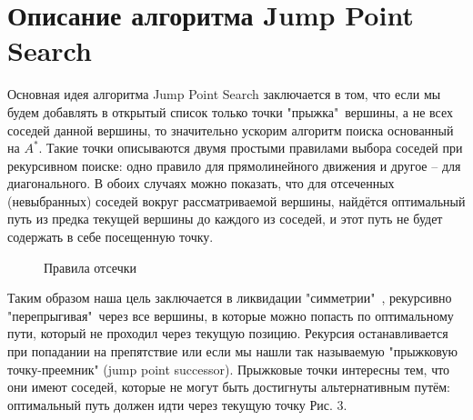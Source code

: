 \documentclass{physlab}
\begin{document}
\section{Описание алгоритма Jump Point Search}
Основная идея алгоритма Jump Point Search заключается в том, что если мы будем добавлять в открытый список только точки "прыжка"\ вершины, а не всех соседей данной вершины, то значительно ускорим алгоритм поиска основанный на $A^{*}$. Такие точки описываются двумя простыми правилами выбора соседей при рекурсивном поиске: одно правило для прямолинейного движения и другое – для диагонального. В обоих случаях можно показать, что для отсеченных (невыбранных) соседей вокруг рассматриваемой вершины, найдётся оптимальный путь из предка текущей вершины до каждого из соседей, и этот путь не будет содержать в себе посещенную точку. 
\begin{figure}[H]
\begin{minipage}[h]{0.55\linewidth}
\end{minipage}
\hfill
\begin{minipage}[h]{0.55\linewidth}
\end{minipage}
\caption{Правила отсечки}
\end{figure} 
Таким образом наша цель заключается в ликвидации "симметрии"\ , рекурсивно "перепрыгивая"\ через все вершины, в которые можно попасть по оптимальному пути, который не проходил через текущую позицию. Рекурсия останавливается при попадании на препятствие или если мы нашли так называемую "прыжковую точку-преемник" (jump point successor). Прыжковые точки интересны тем, что они имеют соседей, которые не могут быть достигнуты альтернативным путём: оптимальный путь должен идти через текущую точку Рис. 3. 
\end{document}
